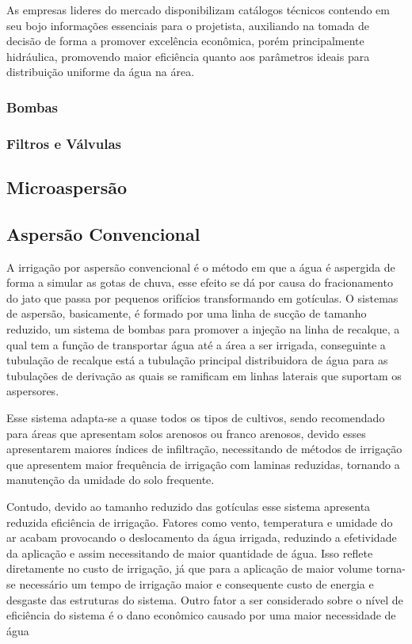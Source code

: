 \documentclass[12pt,a4paper]{book}
\begin{document}
As empresas lideres do mercado disponibilizam catálogos técnicos contendo em seu bojo informações essenciais para o projetista, auxiliando na tomada de decisão de forma a promover excelência econômica, porém principalmente hidráulica, promovendo maior eficiência quanto aos parâmetros ideais para distribuição uniforme da água na área.
\subsubsection{Bombas}

\subsubsection{Filtros e Válvulas}


\subsection{Microaspersão}

\subsection{Aspersão Convencional}
A irrigação por aspersão convencional é o método em que a água é aspergida de forma a simular as gotas de chuva, esse efeito se dá por causa do fracionamento do jato que passa por pequenos orifícios transformando em gotículas. O sistemas de aspersão, basicamente, é formado por uma linha de sucção de tamanho reduzido, um sistema de bombas para promover a injeção na linha de recalque, a qual tem a função de transportar água até a área a ser irrigada, conseguinte a tubulação de recalque está  a tubulação principal distribuidora de água para as tubulações de derivação as quais se ramificam em linhas laterais que suportam os aspersores.

Esse sistema adapta-se a quase todos os tipos de cultivos, sendo recomendado para áreas que apresentam solos arenosos ou franco arenosos, devido esses apresentarem maiores índices de infiltração, necessitando de métodos de irrigação que apresentem maior frequência de irrigação com laminas reduzidas, tornando a manutenção da umidade do solo frequente.

Contudo, devido ao tamanho reduzido das gotículas esse sistema apresenta reduzida eficiência de irrigação. Fatores como vento, temperatura e umidade do ar acabam provocando o deslocamento da água irrigada, reduzindo a efetividade da aplicação e assim necessitando de maior quantidade de água. Isso reflete diretamente no custo de irrigação, já que para a aplicação de maior volume torna-se necessário um tempo de irrigação maior e consequente custo de energia e desgaste das estruturas do sistema. Outro fator a ser considerado sobre o nível de eficiência do sistema é o dano econômico causado por uma maior necessidade de água
\end{document}
